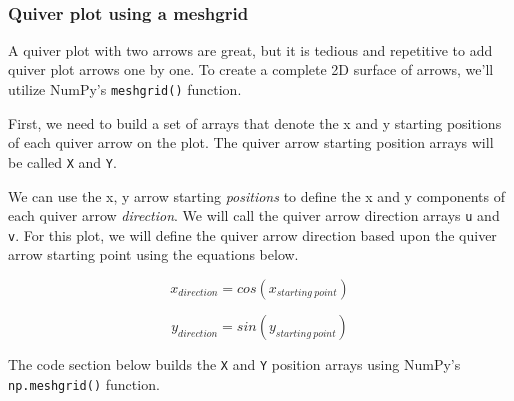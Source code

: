 \documentclass{book}
\newcommand{\passthrough}[1]{#1}
\begin{document}
    \begin{center}
    \end{center}
    { \hspace*{\fill} \\}
    

    
        \hypertarget{quiver-plot-using-a-meshgrid}{%
\subsubsection{Quiver plot using a
meshgrid}\label{quiver-plot-using-a-meshgrid}}

A quiver plot with two arrows are great, but it is tedious and
repetitive to add quiver plot arrows one by one. To create a complete 2D
surface of arrows, we'll utilize NumPy's
\passthrough{\lstinline!meshgrid()!} function.

First, we need to build a set of arrays that denote the x and y starting
positions of each quiver arrow on the plot. The quiver arrow starting
position arrays will be called \passthrough{\lstinline!X!} and
\passthrough{\lstinline!Y!}.

We can use the x, y arrow starting \emph{positions} to define the x and
y components of each quiver arrow \emph{direction}. We will call the
quiver arrow direction arrays \passthrough{\lstinline!u!} and
\passthrough{\lstinline!v!}. For this plot, we will define the quiver
arrow direction based upon the quiver arrow starting point using the
equations below.

\[ x_{direction} = cos(x_{starting \ point}) \]

\[ y_{direction} = sin(y_{starting \ point}) \]

The code section below builds the \passthrough{\lstinline!X!} and
\passthrough{\lstinline!Y!} position arrays using NumPy's
\passthrough{\lstinline!np.meshgrid()!} function.
    
\end{document}
